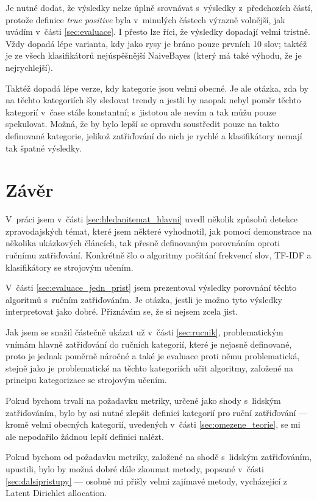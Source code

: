 \documentclass[12pt,a4paper]{report}
\def\chapwithtoc#1{
\chapter*{#1}
\addcontentsline{toc}{chapter}{#1}
}
\begin{document}
Je nutné dodat, že výsledky nelze úplně srovnávat s~výsledky z~předchozích částí, protože definice \emph{true positive} byla v~minulých částech výrazně volnější, jak uvádím v~části \ref{sec:evaluace}. I přesto lze říci, že výsledky dopadají velmi tristně. Vždy dopadá lépe varianta, kdy jako rysy je bráno pouze prvních 10 slov; taktéž je ze všech klasifikátorů nejúspěšnější NaiveBayes (který má také výhodu, že je nejrychlejší).

Taktéž dopadá lépe verze, kdy kategorie jsou velmi obecné. Je ale otázka, zda by na těchto kategoriích šly sledovat trendy a jestli by naopak nebyl poměr těchto kategorií v~čase stále konstantní; s~jistotou ale nevím a tak můžu pouze spekulovat. Možná, že by bylo lepší se opravdu soustředit pouze na takto definované kategorie, jelikož zatřiďování do nich je rychlé a klasifikátory nemají tak špatné výsledky.

\chapwithtoc{Závěr}




V~práci jsem v~části \ref{sec:hledanitemat_hlavni} uvedl několik způsobů detekce zpravodajských témat, které jsem některé vyhodnotil, jak pomocí demonstrace na několika ukázkových článcích, tak přesně definovaným porovnáním oproti ručnímu zatřiďování. Kon\-krét\-ně šlo o algoritmy počítání frekvencí slov, TF-IDF a klasifikátory se strojovým učením.

V~části \ref{sec:evaluace_jedn_prist} jsem prezentoval výsledky porovnání těchto algoritmů s~ručním zatřiďováním. Je otázka, jestli je možno tyto výsledky interpretovat jako dobré. Přiznávám se, že si nejsem zcela jist.

Jak jsem se snažil částečně ukázat už v~části \ref{sec:rucnik}, problematickým vnímám hlavně zatřiďování do ručních kategorií, které je nejasně definované, proto je jednak poměrně náročné a také je evaluace proti němu problematická, stejně jako je problematické na těchto kategoriích učit algoritmy, založené na principu kategorizace se strojovým učením.

Pokud bychom trvali na požadavku metriky, určené jako shody s~lidským zatřiďováním, bylo by asi nutné zlepšit definici kategorií pro ruční zatřiďování --- kromě velmi obecných kategorií, uvedených v~části \ref{sec:omezene_teorie}, se mi ale nepodařilo žádnou lepší definici nalézt. 

Pokud bychom od požadavku metriky, za\-lo\-že\-né na shodě s~lid\-ským za\-třiď\-o\-vá\-ním, upustili, bylo by možná dobré dále zkoumat metody, popsané v~části \ref{sec:dalsipristupy} --- osobně mi přišly velmi zajímavé metody, vycházející z Latent Dirichlet allocation.
\end{document}
